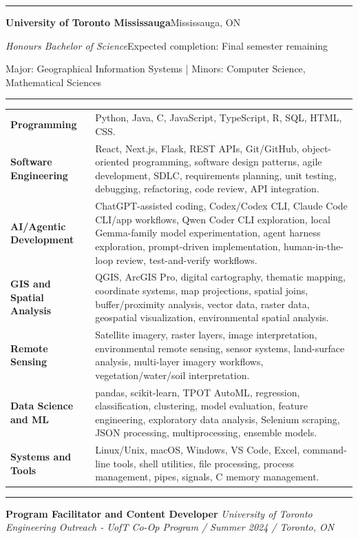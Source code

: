 \documentclass[10.5pt,letterpaper]{article}
\newcommand{\ressection}[1]{\vspace{6pt}{\Large\bfseries\color{sectionblue}#1}\par\vspace{-2pt}\hrule\vspace{4pt}}
\begin{document}
\ressection{Education}
\textbf{University of Toronto Mississauga}\hfill Mississauga, ON\par
\textit{Honours Bachelor of Science}\hfill Expected completion: Final semester remaining\par
Major: Geographical Information Systems | Minors: Computer Science, Mathematical Sciences
\ressection{Skills Bank}
\begin{tabular}{p{1.65in}p{5.35in}}
\textbf{Programming} & Python, Java, C, JavaScript, TypeScript, R, SQL, HTML, CSS. \\[-1pt]
\textbf{Software Engineering} & React, Next.js, Flask, REST APIs, Git/GitHub, object-oriented programming, software design patterns, agile development, SDLC, requirements planning, unit testing, debugging, refactoring, code review, API integration. \\[-1pt]
\textbf{AI/Agentic Development} & ChatGPT-assisted coding, Codex/Codex CLI, Claude Code CLI/app workflows, Qwen Coder CLI exploration, local Gemma-family model experimentation, agent harness exploration, prompt-driven implementation, human-in-the-loop review, test-and-verify workflows. \\[-1pt]
\textbf{GIS and Spatial Analysis} & QGIS, ArcGIS Pro, digital cartography, thematic mapping, coordinate systems, map projections, spatial joins, buffer/proximity analysis, vector data, raster data, geospatial visualization, environmental spatial analysis. \\[-1pt]
\textbf{Remote Sensing} & Satellite imagery, raster layers, image interpretation, environmental remote sensing, sensor systems, land-surface analysis, multi-layer imagery workflows, vegetation/water/soil interpretation. \\[-1pt]
\textbf{Data Science and ML} & pandas, scikit-learn, TPOT AutoML, regression, classification, clustering, model evaluation, feature engineering, exploratory data analysis, Selenium scraping, JSON processing, multiprocessing, ensemble models. \\[-1pt]
\textbf{Systems and Tools} & Linux/Unix, macOS, Windows, VS Code, Excel, command-line tools, shell utilities, file processing, process management, pipes, signals, C memory management. \\[-1pt]
\end{tabular}
\ressection{Experience}
\textbf{Program Facilitator and Content Developer} \hfill \textit{University of Toronto Engineering Outreach - UofT Co-Op Program / Summer 2024 / Toronto, ON}\par
\end{document}
